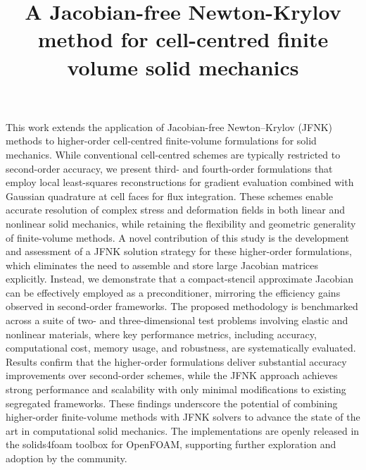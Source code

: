 \documentclass[sn-mathphys,Numbered]{sn-jnl}%
\begin{document}
\title[Article Title]{A Jacobian-free Newton-Krylov method for cell-centred finite volume solid mechanics}

\author[1,2]{ }
\author[1,3]{ }
\author*[1]{ }


\abstract
{
This work extends the application of Jacobian-free Newton–Krylov (JFNK) methods to higher-order cell-centred finite-volume formulations for solid mechanics.
While conventional cell-centred schemes are typically restricted to second-order accuracy, we present third- and fourth-order formulations that employ local least-squares reconstructions for gradient evaluation combined with Gaussian quadrature at cell faces for flux integration.
These schemes enable accurate resolution of complex stress and deformation fields in both linear and nonlinear solid mechanics, while retaining the flexibility and geometric generality of finite-volume methods.
A novel contribution of this study is the development and assessment of a JFNK solution strategy for these higher-order formulations, which eliminates the need to assemble and store large Jacobian matrices explicitly.
Instead, we demonstrate that a compact-stencil approximate Jacobian can be effectively employed as a preconditioner, mirroring the efficiency gains observed in second-order frameworks.
The proposed methodology is benchmarked across a suite of two- and three-dimensional test problems involving elastic and nonlinear materials, where key performance metrics, including accuracy, computational cost, memory usage, and robustness, are systematically evaluated.
Results confirm that the higher-order formulations deliver substantial accuracy improvements over second-order schemes, while the JFNK approach achieves strong performance and scalability with only minimal modifications to existing segregated frameworks.
These findings underscore the potential of combining higher-order finite-volume methods with JFNK solvers to advance the state of the art in computational solid mechanics.
The implementations are openly released in the solids4foam toolbox for OpenFOAM, supporting further exploration and adoption by the community.
}
\end{document}
